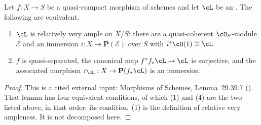 \begin{lemma}
\label{lem:pc-relative-very-ample-criterion}
Let $f:X\to S$ be a quasi-compact morphism of schemes and let $\cL$ be an
.  The
following are equivalent.
\begin{enumerate}
\item $\cL$ is relatively very ample on $X/S$: there are a
quasi-coherent $\cO_S$-module $\mathcal E$ and an immersion
$i:X\to\mathbf P(\mathcal E)$ over $S$ with $i^*\cO(1)\cong\cL$.
\item $f$ is quasi-separated, the canonical map
$f^*f_*\cL\to\cL$ is surjective, and the associated morphism
$r_{\cL}:X\to\mathbf P(f_*\cL)$ is an immersion.
\end{enumerate}
\end{lemma}
\begin{proof}
This is a cited external input: Morphisms of Schemes, Lemma~29.39.7
().  That lemma has four equivalent conditions, of
which (1) and (4) are the two listed above, in that order; its
condition~(1) is the definition of relative very ampleness.  It is not
decomposed here.
\end{proof}

